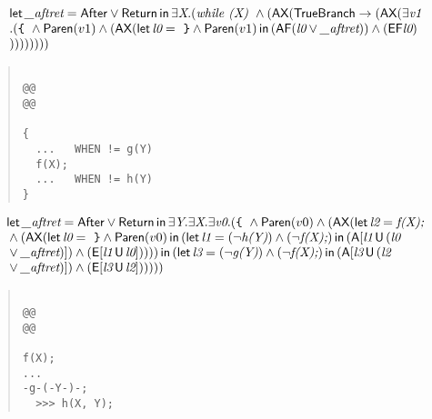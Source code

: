 \documentclass{article}
\newcommand{\U}{\,\mbox{\sf{U}}\,}
\newcommand{\A}{\mbox{\sf{A}}}
\newcommand{\E}{\mbox{\sf{E}}}
\newcommand{\AX}{\mbox{\sf{AX}}}
\newcommand{\AF}{\mbox{\sf{AF}}}
\newcommand{\EF}{\mbox{\sf{EF}}}
\newcommand{\mita}[1]{\mbox{\it{{#1}}}}
\newcommand{\msf}[1]{\mbox{\sf{{#1}}}}
\newcommand{\ttlb}{\mbox{\tt \char'173}}
\newcommand{\ttrb}{\mbox{\tt \char'175}}
\begin{document}
\[\begin{array}{l}
\mita{\sf{let}} \, \mita{\_aftret} = \msf{After} \vee \msf{Return} \, \mita{\sf{in}} \, \exists \mita{X} . (\mita{while (X) } \wedge (\AX(\msf{TrueBranch} \rightarrow (\AX(\exists \mita{v1}\\\mbox{} . (\mita{{\ttlb}
  } \wedge \msf{Paren}(v1) \wedge (\AX(\mita{\sf{let}} \, \mita{l0} = \mita{
{\ttrb}} \wedge \msf{Paren}(v1) \, \mita{\sf{in}} \, (\AF(\mita{l0} \vee \mita{\_aftret})) \wedge (\EF\mita{l0})\\\mbox{}
))))))))

\end{array}\]

\begin{quote}\begin{verbatim}

@@
@@

{
  ...   WHEN != g(Y)
  f(X);
  ...   WHEN != h(Y)
}
\end{verbatim}\end{quote}

\[\begin{array}{l}
\mita{\sf{let}} \, \mita{\_aftret} = \msf{After} \vee \msf{Return} \, \mita{\sf{in}} \, \exists \mita{Y} . \exists \mita{X} . \exists \mita{v0} . (\mita{{\ttlb}
  } \wedge \msf{Paren}(v0) \wedge (\AX(\mita{\sf{let}} \, \mita{l2} = \mita{f(X);}\\\mbox{} \wedge (\AX(\mita{\sf{let}} \, \mita{l0} = \mita{
{\ttrb}} \wedge \msf{Paren}(v0) \, \mita{\sf{in}} \, (\mita{\sf{let}} \, \mita{l1} = (\neg \mita{h(Y)}) \wedge (\neg \mita{f(X);}) \, \mita{\sf{in}} \, (\A[\mita{l1} \U (\mita{l0}\\\mbox{} \vee \mita{\_aftret})]
) \wedge (\E[\mita{l1} \U \mita{l0}]
)
)
)) \, \mita{\sf{in}} \, (\mita{\sf{let}} \, \mita{l3} = (\neg \mita{g(Y)}) \wedge (\neg \mita{f(X);}) \, \mita{\sf{in}} \, (\A[\mita{l3} \U (\mita{l2}\\\mbox{} \vee \mita{\_aftret})]
) \wedge (\E[\mita{l3} \U \mita{l2}]
)
)
)))

\end{array}\]

\begin{quote}\begin{verbatim}

@@
@@

f(X);
...
-g-(-Y-)-;
  >>> h(X, Y);

\end{verbatim}\end{quote}
\end{document}
